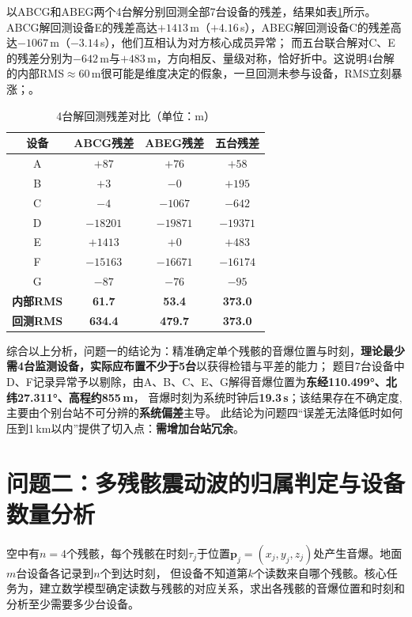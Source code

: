 \documentclass[draft,12pt,a4paper]{ctexart}
\theoremstyle{definition}
\begin{document}
以ABCG和ABEG两个4台解分别回测全部7台设备的残差，结果如表\ref{tab:backtest}所示。ABCG解回测设备E的残差高达$+1413$\,m（$+4.16$\,s），ABEG解回测设备C的残差高达$-1067$\,m（$-3.14$\,s），他们互相认为对方核心成员异常；
而五台联合解对C、E的残差分别为$-642$\,m与$+483$\,m，方向相反、量级对称，恰好折中。这说明4台解的内部RMS$\approx$60\,m很可能是维度决定的假象，一旦回测未参与设备，RMS立刻暴涨；。

\begin{table}[H]\centering
  \caption{4台解回测残差对比（单位：m）}\label{tab:backtest}
  \small
  \begin{tabular}{cccc}
    \toprule
    \textbf{设备}  & \textbf{ABCG残差} & \textbf{ABEG残差}& \textbf{五台残差} \\
    \midrule
    A & $+87$  & $+76$ & $+58$ \\
    B & $+3$   & $-0$   & $+195$ \\
    C & $-4$      & $-1067$ & $-642$ \\
    D     & $-18201$   & $-19871$  & $-19371$ \\
    E     & $+1413$ & $+0$   & $+483$ \\
    F      & $-15163$   & $-16671$   & $-16174$ \\
    G  & $-87$  & $-76$ &  $-95$ \\
    \midrule
    \textbf{内部RMS} & \textbf{61.7} & \textbf{53.4} & \textbf{373.0} \\
    \textbf{回测RMS} & \textbf{634.4} &  \textbf{479.7} &  \textbf{373.0} \\
    \bottomrule
  \end{tabular}
\end{table}

综合以上分析，问题一的结论为：精准确定单个残骸的音爆位置与时刻，\textbf{理论最少需4台监测设备，实际应布置不少于5台}以获得检错与平差的能力；
题目7台设备中D、F记录异常予以剔除，由A、B、C、E、G解得音爆位置为\textbf{东经110.499°、北纬27.311°、高程约855\,m}，
音爆时刻为系统时钟后\textbf{19.3\,s}；该结果存在不确定度,主要由个别台站不可分辨的\textbf{系统偏差}主导。
此结论为问题四``误差无法降低时如何压到1\,km以内''提供了切入点：\textbf{需增加台站冗余}。
\section{问题二：多残骸震动波的归属判定与设备数量分析}

空中有$n=4$个残骸，每个残骸在时刻$\tau_j$于位置$\mathbf{p}_j=(x_j,y_j,z_j)$处产生音爆。地面$m$台设备各记录到$n$个到达时刻，
但设备不知道第$k$个读数来自哪个残骸。核心任务为，建立数学模型确定读数与残骸的对应关系，求出各残骸的音爆位置和时刻和分析至少需要多少台设备。
\end{document}
